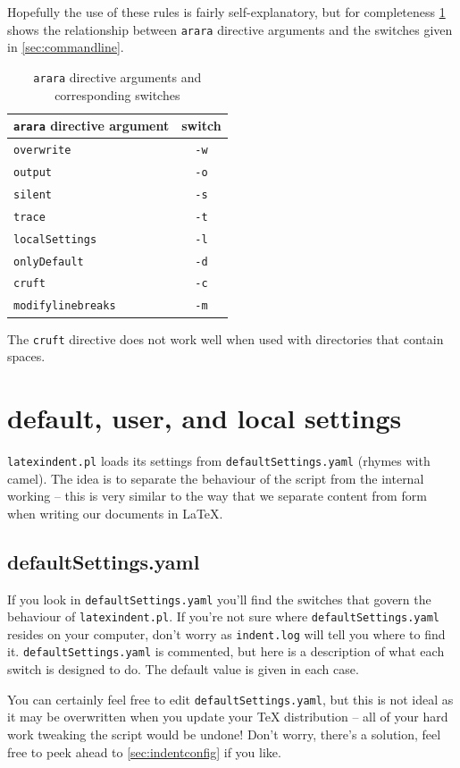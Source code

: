 \documentclass[8pt]{article}
\begin{document}
Hopefully the use of these rules is fairly self-explanatory, but for completeness
\cref{tab:orbsandswitches} shows the relationship between \texttt{arara} directive arguments and the
switches given in \cref{sec:commandline}.

\begin{table}[!ht]
	\centering
	\caption{\texttt{arara} directive arguments and corresponding switches}
	\label{tab:orbsandswitches}
	\begin{tabular}{lc}
		\toprule
		\texttt{arara} directive argument & switch         \\
		\midrule
		\texttt{overwrite}                & \texttt{-w} \\
		\texttt{output}                   & \texttt{-o} \\
		\texttt{silent}                   & \texttt{-s} \\
		\texttt{trace}                    & \texttt{-t} \\
		\texttt{localSettings}            & \texttt{-l} \\
		\texttt{onlyDefault}              & \texttt{-d} \\
		\texttt{cruft}                    & \texttt{-c} \\
		\texttt{modifylinebreaks}                    & \texttt{-m} \\
		\bottomrule
	\end{tabular}
\end{table}

The \texttt{cruft} directive does not work well when used with
directories that contain spaces.

\section{default, user, and local settings}\label{sec:defuseloc}
\texttt{latexindent.pl} loads its settings from \texttt{defaultSettings.yaml}
(rhymes with camel). The idea is to separate the behaviour of the script
from the internal working -- this is very similar to the way that we separate content
from form when writing our documents in \LaTeX.

\subsection{defaultSettings.yaml}
If you look in \texttt{defaultSettings.yaml} you'll find the switches
that govern the behaviour of \texttt{latexindent.pl}. If you're not sure where
\texttt{defaultSettings.yaml} resides on your computer, don't worry as \texttt{indent.log}
will tell you where to find it.
\texttt{defaultSettings.yaml} is commented,
but here is a description of what each switch is designed to do. The default
value is given in each case.

You can certainly feel free to edit \texttt{defaultSettings.yaml}, but
this is not ideal as it may be overwritten when you update your \TeX{} distribution --
all of your hard work tweaking the script would be undone! Don't worry,
there's a solution, feel free to peek ahead to \cref{sec:indentconfig} if you like.
\end{document}
